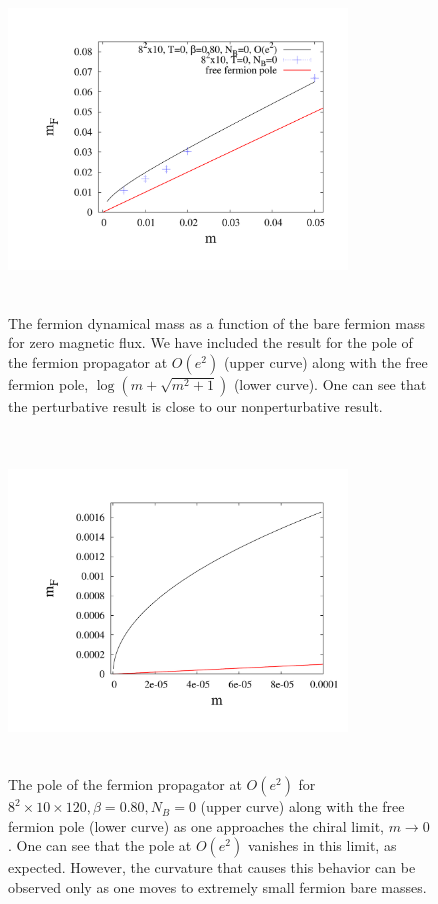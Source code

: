 \documentclass[aps,prd,twocolumn,showpacs,superscriptaddress,groupedaddress]{revtex4}  %
\begin{document}
\begin{figure}
\vspace{-1.2cm}
  \includegraphics[height=9cm,width=9cm]{ferm_pole_vs_m.pdf} 
  \vspace{-1.25cm}
\caption{The fermion dynamical mass as a function of the bare fermion mass for zero magnetic flux. We have included the result for the pole of the fermion propagator at $O(e^2)$ (upper curve) along with the free fermion pole, $\log\left(m+\sqrt{m^2+1}\right)$ (lower curve). One can see that the perturbative result is close to our nonperturbative result.}
\label{MFvsmZeroB}
\end{figure}

\begin{figure}
\vspace{-1.2cm}
  \includegraphics[height=9cm,width=9cm]{ferm_pole_vs_m_zoom.pdf} 
  \vspace{-1.25cm}
\caption{The pole of the fermion propagator at $O(e^2)$ for $8^2\times10\times120, \beta=0.80, N_B=0$ (upper curve) along with the free fermion pole (lower curve) as one approaches the chiral limit, $m \to 0$. One can see that the pole at $O(e^2)$ vanishes in this limit, as expected. However, the curvature that causes this behavior can be observed only as one moves to extremely small fermion bare masses.}
\label{MFvsmZeroBZoom}
\end{figure}
\end{document}
